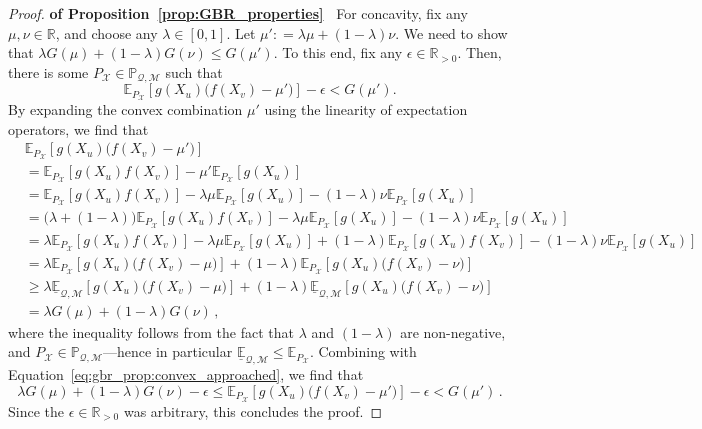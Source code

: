 \documentclass[3p]{elsarticle}
\newcommand{\reals}{\mathbb{R}}
\newcommand{\realspos}{\reals_{>0}}
\newcommand{\states}{\mathcal{X}}
\newcommand{\lexp}{\underline{\mathbb{E}}_{\rateset,\mathcal{M}}}
\newcommand{\rateset}{\mathcal{Q}}
\newcommand{\coloneqq}{:\!=}
\begin{document}
\begin{proof}{\bf of Proposition~\ref{prop:GBR_properties}~}
For concavity, fix any $\mu,\nu\in\reals$, and choose any $\lambda\in[0,1]$. Let $\mu'\coloneqq \lambda\mu + (1-\lambda)\nu$. We need to show that $\lambda G(\mu) + (1-\lambda)G(\nu) \leq G(\mu')$. To this end, fix any $\epsilon\in\realspos$. Then, there is some ${P_\states}\in\mathbb{P}_{\rateset,\mathcal{M}}$ such that
\begin{equation}\label{eq:gbr_prop:convex_approached}
\mathbb{E}_{P_\states}\left[g(X_u)\bigl(f(X_v) - \mu'\bigr)\right] - \epsilon < G(\mu').
\end{equation}
By expanding the convex combination $\mu'$ using the linearity of expectation operators, we find that
\begin{align*}
&\mathbb{E}_{P_\states}\left[g(X_u)\bigl(f(X_v) - \mu'\bigr)\right]\\  &= \mathbb{E}_{P_\states}\left[g(X_u)f(X_v)\right] - \mu'\mathbb{E}_{P_\states}\left[g(X_u)\right] \\
 &= \mathbb{E}_{P_\states}\left[g(X_u)f(X_v)\right] - \lambda\mu\mathbb{E}_{P_\states}\left[g(X_u)\right] - (1-\lambda)\nu\mathbb{E}_{P_\states}\left[g(X_u)\right] \\
 &= \bigl(\lambda + (1-\lambda)\bigr)\mathbb{E}_{P_\states}\left[g(X_u)f(X_v)\right] - \lambda\mu\mathbb{E}_{P_\states}\left[g(X_u)\right] - (1-\lambda)\nu\mathbb{E}_{P_\states}\left[g(X_u)\right] \\
 &= \lambda\mathbb{E}_{P_\states}\left[g(X_u)f(X_v)\right] - \lambda\mu\mathbb{E}_{P_\states}\left[g(X_u)\right]
+(1-\lambda)\mathbb{E}_{P_\states}\left[g(X_u)f(X_v)\right] - (1-\lambda)\nu\mathbb{E}_{P_\states}\left[g(X_u)\right] \\
 &= \lambda\mathbb{E}_{P_\states}\left[g(X_u)\bigl(f(X_v) - \mu\bigr)\right] + (1-\lambda)\mathbb{E}_{P_\states}\left[g(X_u)\bigl(f(X_v) - \nu\bigr)\right] \\
 &\geq \lambda\lexp\left[g(X_u)\bigl(f(X_v) - \mu\bigr)\right] + (1-\lambda)\lexp\left[g(X_u)\bigl(f(X_v) - \nu\bigr)\right] \\
 &= \lambda G(\mu) + (1-\lambda) G(\nu)\,,
\end{align*}
where the inequality follows from the fact that $\lambda$ and $(1-\lambda)$ are non-negative, and $P_\states\in\mathbb{P}_{\rateset,\mathcal{M}}$---hence in particular $\lexp\leq\mathbb{E}_{P_\states}$.
Combining with Equation~\eqref{eq:gbr_prop:convex_approached}, we find that
\begin{equation*}
\lambda G(\mu) + (1-\lambda) G(\nu) -\epsilon \leq \mathbb{E}_{P_\states}\left[g(X_u)\bigl(f(X_v) - \mu'\bigr)\right] - \epsilon < G(\mu')\,.
\end{equation*}
Since the $\epsilon\in\realspos$ was arbitrary, this concludes the proof.


\end{proof}
\end{document}
